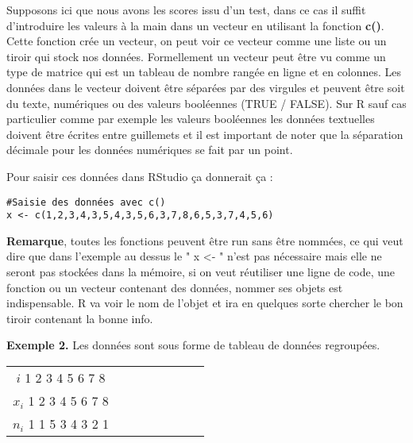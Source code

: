 \documentclass{report}
\begin{document}
Supposons ici que nous avons les scores issu d'un test, dans ce cas il suffit d'introduire les valeurs à la main dans un vecteur en utilisant la fonction \textbf{c()}. Cette fonction crée un vecteur, on peut voir ce vecteur comme une liste ou un tiroir qui stock nos données. Formellement un vecteur peut être vu comme un type de matrice qui est un tableau de nombre rangée en ligne et en colonnes. Les données dans le vecteur doivent être séparées par des virgules et peuvent être soit du texte, numériques ou des valeurs booléennes (TRUE / FALSE). Sur R sauf cas particulier comme par exemple les valeurs booléennes les données textuelles doivent être écrites entre guillemets et il est important de noter que la séparation décimale pour les données numériques se fait par un point.

Pour saisir ces données dans RStudio ça donnerait ça :

\begin{verbatim}
#Saisie des données avec c()
x <- c(1,2,3,4,3,5,4,3,5,6,3,7,8,6,5,3,7,4,5,6)
\end{verbatim}

\textbf{Remarque}, toutes les fonctions peuvent être run sans être nommées, ce qui veut dire que dans l'exemple au dessus le " x <- " n'est pas nécessaire mais elle ne seront pas stockées dans la mémoire, si on veut réutiliser une ligne de code, une fonction ou un vecteur contenant des données, nommer ses objets est indispensable. R va voir le nom de l'objet et ira en quelques sorte chercher le bon tiroir contenant la bonne info.

\textbf{Exemple 2.} Les données sont sous forme de tableau de données regroupées.

\begin{center}
        \begin{tabular}{ c c c c c c c c}
            $i$ 1 2 3 4 5 6 7 8 \\
            $x_i$ 1 2 3 4 5 6 7 8 \\
            $n_i$ 1 1 5 3 4 3 2 1 \\
        \end{tabular}
    \end{center}
\end{document}
